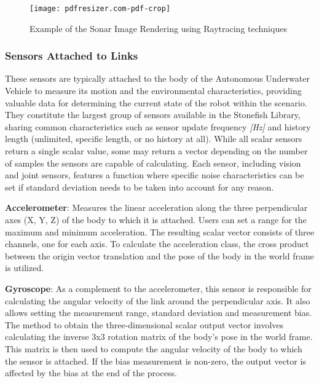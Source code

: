 \documentclass[]{article}
\begin{document}
	\begin{figure}
		\begin{center}
			\texttt{[image: pdfresizer.com-pdf-crop]}
		\end{center}
		\caption{Example of the Sonar Image Rendering using Raytracing techniques}
	\end{figure}
	
	
		\subsubsection{Sensors Attached to Links}
		
		These sensors are typically attached to the body of the Autonomous Underwater Vehicle to measure its motion and the environmental characteristics, providing valuable data for determining the current state of the robot within the scenario. They constitute the largest group of sensors available in the Stonefish Library, sharing common characteristics such as sensor update frequency \textit{[Hz]} and history length (unlimited, specific length, or no history at all). While all scalar sensors return a single scalar value, some may return a vector depending on the number of samples the sensors are capable of calculating. Each sensor, including vision and joint sensors, features a function where specific noise characteristics can be set if standard deviation needs to be taken into account for any reason.
		
		\textbf{Accelerometer}: Measures the linear acceleration along the three perpendicular axes (X, Y, Z) of the body to which it is attached. Users can set a range for the maximum and minimum acceleration. The resulting scalar vector consists of three channels, one for each axis. To calculate the acceleration class, the cross product between the origin vector translation and the pose of the body in the world frame is utilized.
		
		\textbf{Gyroscope}: As a complement to the accelerometer, this sensor is responsible for calculating the angular velocity of the link around the perpendicular axis. It also allows setting the measurement range, standard deviation and measurement bias. The method to obtain the three-dimensional scalar output vector involves calculating the inverse 3x3 rotation matrix of the body's pose in the world frame. This matrix is then used to compute the angular velocity of the body to which the sensor is attached. If the bias measurement is non-zero, the output vector is affected by the bias at the end of the process.
		
\end{document}
